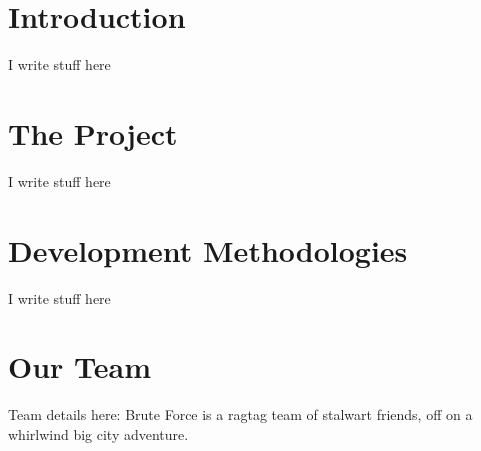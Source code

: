 \documentclass[12pt,a4paper]{article}
\begin{document}
   \section{Introduction}
   I write stuff here

   \section{The Project}
   I write stuff here

   \section{Development Methodologies}
   I write stuff here

   \section{Our Team}
   Team details here:
   Brute Force is a ragtag team of stalwart friends, off on a whirlwind big city adventure.
\end{document}
